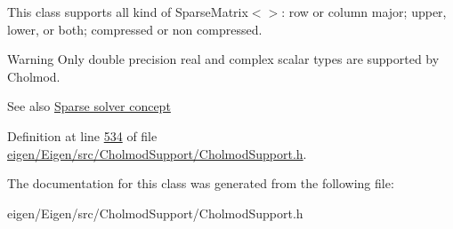 This class supports all kind of Sparse\+Matrix$<$$>$\+: row or column major; upper, lower, or both; compressed or non compressed.

\begin{DoxyWarning}{Warning}
Only double precision real and complex scalar types are supported by Cholmod.
\end{DoxyWarning}
\begin{DoxySeeAlso}{See also}
\hyperlink{SparseLinearSystems.dox_TutorialSparseSolverConcept}{Sparse solver concept} 
\end{DoxySeeAlso}


Definition at line \hyperlink{eigen_2_eigen_2src_2_cholmod_support_2_cholmod_support_8h_source_l00534}{534} of file \hyperlink{eigen_2_eigen_2src_2_cholmod_support_2_cholmod_support_8h_source}{eigen/\+Eigen/src/\+Cholmod\+Support/\+Cholmod\+Support.\+h}.



The documentation for this class was generated from the following file\+:\begin{DoxyCompactItemize}
\item 
eigen/\+Eigen/src/\+Cholmod\+Support/\+Cholmod\+Support.\+h\end{DoxyCompactItemize}

